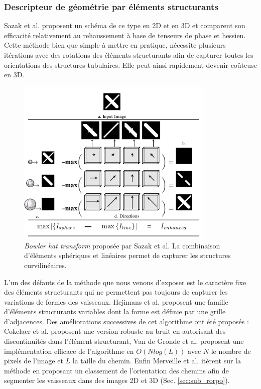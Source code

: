\subsubsection{Descripteur de géométrie par éléments structurants}
\label{sec:EA:rehaussement:morpho}
 Sazak et al. proposent un schéma de ce type en 2D \cite{Sazak2019_bowler_hat_2D} et en 3D \cite{Sazak2018_bowler_hat_3D} et comparent son efficacité relativement au rehaussement à base de tenseurs de phase et hessien. Cette méthode bien que simple à mettre en pratique, nécessite plusieurs itérations avec des rotations des éléments structurants afin de capturer toutes les orientations des structures tubulaires. Elle peut ainsi rapidement devenir coûteuse en 3D.
\begin{figure}[h]
\centering
\includegraphics[height=8cm]{Images/bowlerHat_3D.png}
\caption{\textit{Bowler hat transform} proposée par Sazak et al. \cite{Sazak2018_bowler_hat_3D} La combinaison d'éléments sphériques et linéaires permet de capturer les structures curvilinéaires. }
\label{fig:sazak_bowler_hat}
\end{figure}
L'un des défauts de la méthode que nous venons d'exposer est le caractère fixe des éléments structurants qui ne permettent pas toujours de capturer les variations de formes des vaisseaux. Hejimans et al. \cite{Heijmans2005_path_opening} proposent une famille d'éléments structurants variables dont la forme est définie par une grille d'adjacences. Des améliorations successives de cet algorithme ont été proposés : Cokelaer et al. \cite{Cokelaer2012_efficient_path_opening} proposent une version robuste au bruit en autorisant des discontinuités dans l'élément structurant, Van de Gronde et al. \cite{Gronde2015_fast_path_opening} proposent une implémentation efficace de l'algorithme en $O( N log ( L ))$ avec $N$ le nombre de pixels de l'image et $L$ la taille du chemin. Enfin Merveille et al. \cite{Merveille2018_curvilinear} itèrent sur la méthode en proposant un classement de l'orientation des chemins afin de segmenter les vaisseaux dans des images 2D et 3D (Sec. \ref{sec:sub_rorpo}). 
